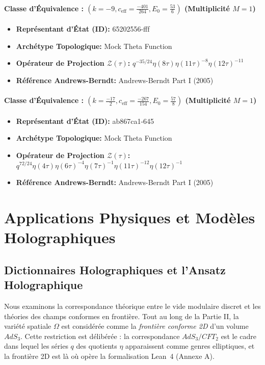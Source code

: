 \documentclass[11pt,twoside,openright]{book}
\begin{document}
\subsection*{Classe d'Équivalence : $(k=-9, c_{\text{eff}}=\frac{-401}{264}, E_0=\frac{53}{6})$ (Multiplicité $M=1$)}
\begin{itemize}
  \item \textbf{Représentant d'État (ID):} 65202556-fff
  \item \textbf{Archétype Topologique:} Mock Theta Function
  \item \textbf{Opérateur de Projection $\mathcal{Z}(\tau)$:} $q^{-35/24} \eta(8\tau) \eta(11\tau)^{-8} \eta(12\tau)^{-11}$
  \item \textbf{Référence Andrews-Berndt:} Andrews-Berndt Part I (2005)
\end{itemize}

\subsection*{Classe d'Équivalence : $(k=\frac{-17}{2}, c_{\text{eff}}=\frac{-267}{154}, E_0=\frac{57}{8})$ (Multiplicité $M=1$)}
\begin{itemize}
  \item \textbf{Représentant d'État (ID):} ab867ca1-645
  \item \textbf{Archétype Topologique:} Mock Theta Function
  \item \textbf{Opérateur de Projection $\mathcal{Z}(\tau)$:} $q^{72/24} \eta(4\tau) \eta(6\tau)^{-4} \eta(7\tau)^{-1} \eta(11\tau)^{-12} \eta(12\tau)^{-1}$
  \item \textbf{Référence Andrews-Berndt:} Andrews-Berndt Part I (2005)
\end{itemize}

\part{Applications Physiques et Modèles Holographiques}

\chapter{Dictionnaires Holographiques et l'Ansatz Holographique}

Nous examinons la correspondance théorique entre le vide modulaire discret et les théories des champs conformes en frontière. Tout au long de la Partie II, la variété spatiale $\Omega$ est considérée comme la \emph{frontière conforme 2D} d'un volume $AdS_3$. Cette restriction est délibérée : la correspondance $AdS_3/CFT_2$ est le cadre dans lequel les séries $q$ des quotients $\eta$ apparaissent comme genres elliptiques, et la frontière 2D est là où opère la formalisation Lean~4 (Annexe A).
\end{document}
